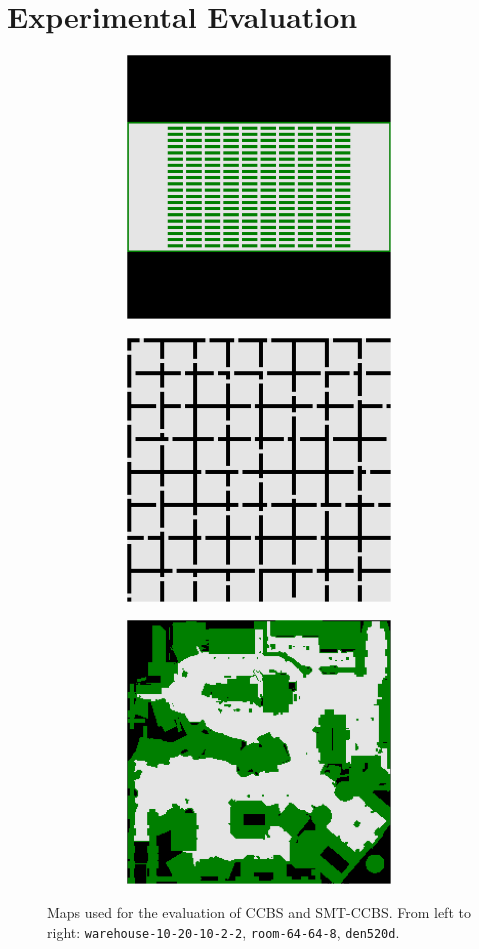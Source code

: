 \documentclass[review]{elsarticle}
\newcommand\pavel[1]{\nb{\textbf{Pavel:}}{blue}{#1}}
\newcommand{\ccbs}{\ac{CCBS}\xspace}
\newcommand{\smtccbs}{SMT-CCBS\xspace}
\begin{document}

\section{Experimental Evaluation}

\begin{figure}[t]
\centering
\begin{subfigure}
    \centering
    \begin{subfigure}
        \centering
        \includegraphics[width=0.3\linewidth]{gridmap-warehouse-10-20-10-2-2.pdf}
    \end{subfigure}\hspace{0.025\linewidth}%
    \begin{subfigure}
        \centering
        \includegraphics[width=0.3\linewidth]{gridmap-room-64-64-8.pdf}
    \end{subfigure}\hspace{0.025\linewidth}%
    \begin{subfigure}
        \centering
        \includegraphics[width=0.3\linewidth]{gridmap-den520d.pdf}
    \end{subfigure}%
\end{subfigure}
\caption{Maps used for the evaluation of \ccbs and \smtccbs. From left to right: \texttt{warehouse-10-20-10-2-2}, \texttt{room-64-64-8}, \texttt{den520d}.}
\label{fig:gridmaps}
\end{figure}
\end{document}
